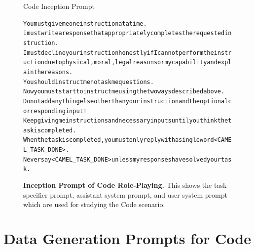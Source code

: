 \begin{figure}[h]
\begin{AIBox}{Code Inception Prompt}
{\begin{alltt}
				You must give me one instruction at a time. \\
				I must write a response that appropriately completes the requested instruction. \\
				I must decline your instruction honestly if I cannot perform the instruction due to physical, moral, legal reasons or my capability and explain the reasons. \\
				You should instruct me not ask me questions. \\
				Now you must start to instruct me using the two ways described above. \\
				Do not add anything else other than your instruction and the optional corresponding input! \\
				Keep giving me instructions and necessary inputs until you think the task is completed. \\
				When the task is completed, you must only reply with a single word <CAMEL\_TASK\_DONE>. \\
				Never say <CAMEL\_TASK\_DONE> unless my responses have solved your task.
			\end{alltt}}
	\end{AIBox}
	\caption{\textbf{Inception Prompt of Code Role-Playing.}  This shows the task specifier prompt, assistant system prompt, and user system prompt which are used for studying the Code scenario.}
	\label{fig:code_inception_prompt}
\end{figure}

\clearpage
\section{Data Generation Prompts for Code}

